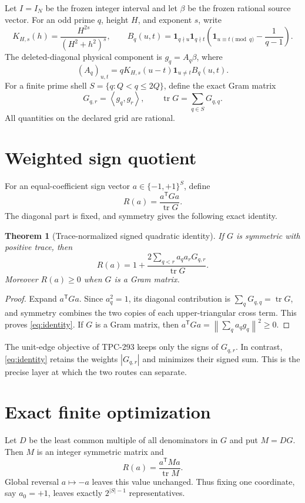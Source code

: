\documentclass[10pt]{article}
\newtheorem{theorem}{Theorem}
\newcommand{\norm}[1]{\left\lVert #1\right\rVert}
\newcommand{\ip}[2]{\left\langle #1,#2\right\rangle}
\begin{document}
Let $I=I_N$ be the frozen integer interval and let $\beta$ be the frozen
rational source vector.  For an odd prime $q$, height $H$, and exponent $s$,
write
\[
 K_{H,s}(h)=\frac{H^{2s}}{(H^2+h^2)^s},\qquad
 B_q(u,t)=\mathbf 1_{q\nmid u}\mathbf 1_{q\nmid t}
 \left(\mathbf 1_{u\equiv t\pmod q}-\frac1{q-1}\right).
\]
The deleted-diagonal physical component is $g_q=A_q\beta$, where
\[
 (A_q)_{u,t}=qK_{H,s}(u-t)\mathbf 1_{u\ne t}B_q(u,t).
 \label{eq:model}
\]
For a finite prime shell $S=\{q:Q<q\le 2Q\}$, define the exact Gram matrix
\[
 G_{q,r}=\ip{g_q}{g_r},\qquad
 \operatorname{tr}G=\sum_{q\in S}G_{q,q}.
 \label{eq:gram}
\]
All quantities on the declared grid are rational.

\section{Weighted sign quotient}

For an equal-coefficient sign vector $a\in\{-1,+1\}^{S}$, define
\[
 R(a)=\frac{a^{\mathsf T}Ga}{\operatorname{tr}G}.
 \label{eq:rayleigh}
\]
The diagonal part is fixed, and symmetry gives the following exact identity.

\begin{theorem}[Trace-normalized signed quadratic identity]
If $G$ is symmetric with positive trace, then
\[
 R(a)=1+\frac{2\sum_{q<r}a_q a_rG_{q,r}}
 {\operatorname{tr}G}.
 \label{eq:identity}
\]
Moreover $R(a)\ge0$ when $G$ is a Gram matrix.
\end{theorem}

\begin{proof}
Expand $a^{\mathsf T}Ga$.  Since $a_q^2=1$, its diagonal contribution is
$\sum_qG_{q,q}=\operatorname{tr}G$, and symmetry combines the two copies of
each upper-triangular cross term.  This proves \eqref{eq:identity}.  If $G$
is a Gram matrix, then $a^{\mathsf T}Ga=\norm{\sum_q a_qg_q}^2\ge0$.
\end{proof}

The unit-edge objective of TPC-293 keeps only the signs of $G_{q,r}$.  In
contrast, \eqref{eq:identity} retains the weights $|G_{q,r}|$ and minimizes
their signed sum.  This is the precise layer at which the two routes can
separate.

\section{Exact finite optimization}

Let $D$ be the least common multiple of all denominators in $G$ and put
$M=DG$.  Then $M$ is an integer symmetric matrix and
\[
 R(a)=\frac{a^{\mathsf T}Ma}{\operatorname{tr}M}.
 \label{eq:integer}
\]
Global reversal $a\mapsto-a$ leaves this value unchanged.  Thus fixing one
coordinate, say $a_0=+1$, leaves exactly $2^{|S|-1}$ representatives.
\end{document}
